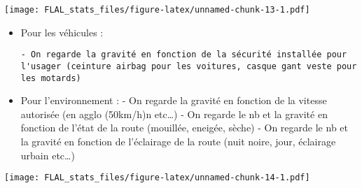 \documentclass[
]{article}
\begin{document}
\texttt{[image: FLAL\_stats\_files/figure-latex/unnamed-chunk-13-1.pdf]}

\begin{itemize}
\item
  Pour les véhicules :

\begin{verbatim}
- On regarde la gravité en fonction de la sécurité installée pour l'usager (ceinture airbag pour les voitures, casque gant veste pour les motards)
\end{verbatim}
\item
  Pour l'environnement : - On regarde la gravité en fonction de la
  vitesse autorisée (en agglo (50km/h)n etc\ldots) - On regarde le nb et
  la gravité en fonction de l'état de la route (mouillée, eneigée,
  sèche) - On regarde le nb et la gravité en fonction de l'éclairage de
  la route (nuit noire, jour, éclairage urbain etc\ldots)
\end{itemize}

\texttt{[image: FLAL\_stats\_files/figure-latex/unnamed-chunk-14-1.pdf]}
\end{document}
